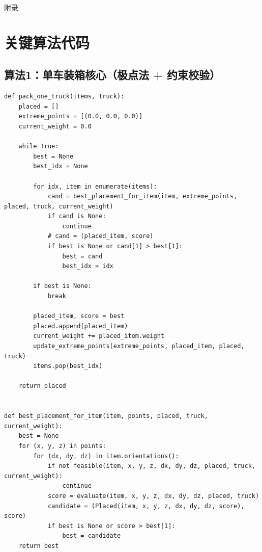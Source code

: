 \documentclass{MMCStyle}
\begin{document}
	\newpage
	\appendix
	\begin{center}
		\heiti{} 附\hspace{1pc}录
	\end{center}

\appendix
\section{关键算法代码}

\subsection{算法1：单车装箱核心（极点法 + 约束校验）}
\begin{lstlisting}[style=pycolor,caption={单车装箱核心流程（节选）}]
def pack_one_truck(items, truck):
    placed = []
    extreme_points = [(0.0, 0.0, 0.0)]
    current_weight = 0.0

    while True:
        best = None
        best_idx = None

        for idx, item in enumerate(items):
            cand = best_placement_for_item(item, extreme_points, placed, truck, current_weight)
            if cand is None:
                continue
            # cand = (placed_item, score)
            if best is None or cand[1] > best[1]:
                best = cand
                best_idx = idx

        if best is None:
            break

        placed_item, score = best
        placed.append(placed_item)
        current_weight += placed_item.weight
        update_extreme_points(extreme_points, placed_item, placed, truck)
        items.pop(best_idx)

    return placed


def best_placement_for_item(item, points, placed, truck, current_weight):
    best = None
    for (x, y, z) in points:
        for (dx, dy, dz) in item.orientations():
            if not feasible(item, x, y, z, dx, dy, dz, placed, truck, current_weight):
                continue
            score = evaluate(item, x, y, z, dx, dy, dz, placed, truck)
            candidate = (Placed(item, x, y, z, dx, dy, dz, score), score)
            if best is None or score > best[1]:
                best = candidate
    return best
\end{lstlisting}
\end{document}
